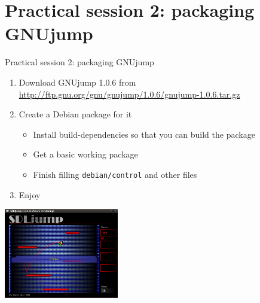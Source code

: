 \documentclass[10pt,final]{beamer}
\begin{document}
\section{Practical session 2: packaging GNUjump}
\begin{frame}{Practical session 2: packaging GNUjump}
\begin{enumerate}
	\item Download GNUjump 1.0.6 from
		\url{http://ftp.gnu.org/gnu/gnujump/1.0.6/gnujump-1.0.6.tar.gz}
		\br
	\item Create a Debian package for it
		\begin{itemize}
			\item Install build-dependencies so that you can build the package
			\item Get a basic working package
			\item Finish filling \texttt{debian/control} and other files
		\end{itemize}
		\br
	\item Enjoy
\end{enumerate}
\centerline{\includegraphics[width=5cm]{figs/gnujump.png}}
\end{frame}
\end{document}
